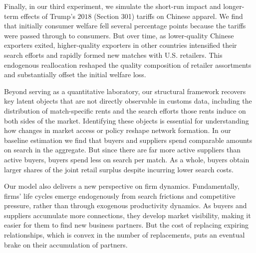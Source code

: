 \documentclass[12pt]{article} \usepackage{amsmath,amssymb,amsthm,geometry,graphicx,setspace,algorithm,algpseudocode,float}
\begin{document}
Finally, in our third experiment, we simulate the short-run impact and longer-term effects of Trump's $2018$  (Section 301) tariffs on Chinese apparel. We find that initially consumer welfare fell several percentage points because the tariffs were passed through to consumers. But over time, as lower-quality Chinese exporters exited, higher-quality exporters in other countries intensified their search efforts and rapidly formed new matches with U.S. retailers. This endogenous reallocation reshaped the quality composition of retailer assortments and substantially offset the initial welfare loss.   

Beyond serving as a quantitative laboratory, our structural framework recovers key latent objects that are not directly observable in customs data, including the distribution of match-specific rents and the search efforts those rents induce on both sides of the market. Identifying these objects is essential for understanding how changes in market access or policy reshape network formation. In our baseline estimation we find that buyers and suppliers spend comparable amounts on search in the aggregate. But since there are far more active suppliers than active buyers, buyers spend less on search per match. As a whole, buyers obtain larger shares of the joint retail surplus despite incurring lower search costs. %

Our model also delivers a new perspective on firm dynamics. Fundamentally, firms' life cycles emerge endogenously from search frictions and competitive pressure, rather than through exogenous productivity dynamics. As buyers and suppliers accumulate more connections, they develop market visibility, making it easier for them to find new business partners. But the cost of replacing expiring relationships, which is convex in the number of replacements, puts an eventual brake on their accumulation of partners.
\end{document}
